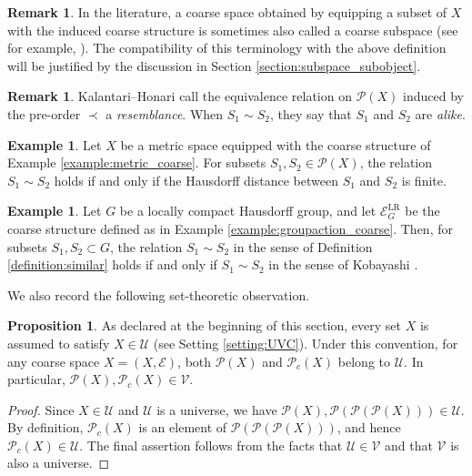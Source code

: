 \documentclass[12pt, a4paper]{amsart}
\theoremstyle{definition}
\newtheorem{proposition}[theorem]{Proposition}
\newtheorem{example}[theorem]{Example}
\newtheorem{remark}[theorem]{Remark}
\begin{document}
\begin{remark}
In the literature, a coarse space obtained by equipping a subset of $X$ with the induced coarse structure is sometimes also called a coarse subspace (see for example, \cite[Definition 2.6]{ChenWang2004Ideal}). The compatibility of this terminology with the above definition will be justified by the discussion in Section \ref{section:subspace_subobject}.
\end{remark}

\begin{remark}
Kalantari--Honari \cite{KalantariHonari2016} call the equivalence relation on $\mathcal{P}(X)$ induced by the pre-order $\prec$ a \emph{resemblance}. When $S_1\sim S_2$, they say that $S_1$ and $S_2$ are \emph{alike}.
\end{remark}

\begin{example}
Let $X$ be a metric space equipped with the coarse structure of Example \ref{example:metric_coarse}. For subsets $S_1,S_2\in\mathcal{P}(X)$, the relation $S_1\sim S_2$ holds if and only if the Hausdorff distance between $S_1$ and $S_2$ is finite.
\end{example}

\begin{example}
Let $G$ be a locally compact Hausdorff group, and let $\mathcal{E}^{\mathrm{LR}}_G$ be the coarse structure defined as in Example \ref{example:groupaction_coarse}. Then, for subsets $S_1,S_2\subset G$, the relation $S_1\sim S_2$ in the sense of Definition \ref{definition:similar} holds if and only if $S_1\sim S_2$ in the sense of Kobayashi \cite{Kobayashi96}.
\end{example}

We also record the following set-theoretic observation.

\begin{proposition}
As declared at the beginning of this section, every set $X$ is assumed to satisfy $X\in\mathcal{U}$ (see Setting \ref{setting:UVC}). Under this convention, for any coarse space $X=(X,\mathcal{E})$, both $\mathcal{P}(X)$ and $\mathcal{P}_c(X)$ belong to $\mathcal{U}$. In particular, $\mathcal{P}(X),\mathcal{P}_c(X)\in\mathcal{V}$.
\end{proposition}

\begin{proof}
Since $X\in\mathcal{U}$ and $\mathcal{U}$ is a universe, we have $\mathcal{P}(X),\mathcal{P}(\mathcal{P}(\mathcal{P}(X)))\in\mathcal{U}$. By definition, $\mathcal{P}_c(X)$ is an element of $\mathcal{P}(\mathcal{P}(\mathcal{P}(X)))$, and hence $\mathcal{P}_c(X)\in\mathcal{U}$. The final assertion follows from the facts that $\mathcal{U}\in\mathcal{V}$ and that $\mathcal{V}$ is also a universe.
\end{proof}
\end{document}
